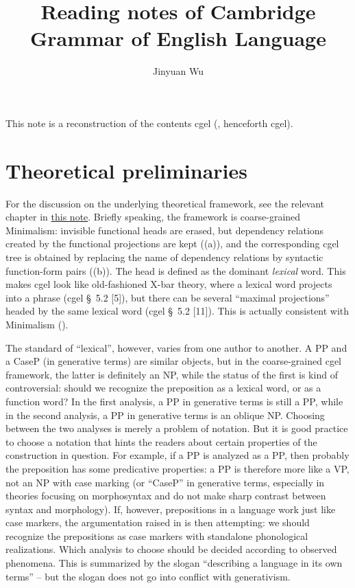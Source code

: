 \documentclass{article}
\title{Reading notes of Cambridge Grammar of English Language}
\author{Jinyuan Wu}
\newcommand*{\citesec}[1]{\S~{#1}}
\begin{document}
\maketitle

\automath

This note is a reconstruction of the contents \acl{cgel} (\citealt{cgel}, henceforth \acs{cgel}). 

\section{Theoretical preliminaries}\label{sec:theory}

For the discussion on the underlying theoretical framework, 
see the relevant chapter in \href{../Chinese/main.pdf}{this note}.
Briefly speaking, the framework is coarse-grained Minimalism:
invisible functional heads are erased,
but dependency relations created by the functional projections are kept ((a)),
and the corresponding \ac{cgel} tree is obtained by replacing the name of dependency relations 
by syntactic function-form pairs ((b)).
The head is defined as the dominant \emph{lexical} word.
This makes \ac{cgel} look like old-fashioned X-bar theory, 
where a lexical word projects into a phrase (\ac{cgel} \citesec{5.2} [5]),
but there can be several ``maximal projections'' headed by the same lexical word (\ac{cgel} \citesec{5.2 [11]}).
This is actually consistent with Minimalism ().

The standard of ``lexical'', however, varies from one author to another.
A PP and a CaseP (in generative terms) are similar objects,
but in the coarse-grained \ac{cgel} framework,
the latter is definitely an NP, 
while the status of the first is kind of controversial:
should we recognize the preposition as a lexical word,
or as a function word?
In the first analysis, a PP in generative terms is still a PP,
while in the second analysis, a PP in generative terms is an oblique NP.
Choosing between the two analyses is merely a problem of notation.
But it is good practice to choose a notation that hints the readers about 
certain properties of the construction in question.
For example, if a PP is analyzed as a PP, then probably the preposition has some predicative properties:
a PP is therefore more like a VP, not an NP with case marking 
(or ``CaseP'' in generative terms, especially in theories focusing on morphosyntax 
and do not make sharp contrast between syntax and morphology).
If, however, prepositions in a language work just like case markers,
the argumentation raised in \citet[\citesec{1.11}, \citesec{5.4}]{dixon2009basic1} is then attempting:
we should recognize the prepositions as case markers with standalone phonological realizations.
Which analysis to choose should be decided according to observed phenomena.
This is summarized by the slogan ``describing a language in its own terms''
-- but the slogan does not go into conflict with generativism.
\end{document}
